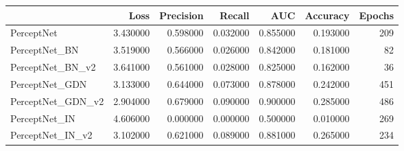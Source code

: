 \begin{tabular}{lrrrrrr}
\toprule
 & Loss & Precision & Recall & AUC & Accuracy & Epochs \\
\midrule
PerceptNet & 3.430000 & 0.598000 & 0.032000 & 0.855000 & 0.193000 & 209 \\
PerceptNet_BN & 3.519000 & 0.566000 & 0.026000 & 0.842000 & 0.181000 & 82 \\
PerceptNet_BN_v2 & 3.641000 & 0.561000 & 0.028000 & 0.825000 & 0.162000 & 36 \\
PerceptNet_GDN & 3.133000 & 0.644000 & 0.073000 & 0.878000 & 0.242000 & 451 \\
PerceptNet_GDN_v2 & 2.904000 & 0.679000 & 0.090000 & 0.900000 & 0.285000 & 486 \\
PerceptNet_IN & 4.606000 & 0.000000 & 0.000000 & 0.500000 & 0.010000 & 269 \\
PerceptNet_IN_v2 & 3.102000 & 0.621000 & 0.089000 & 0.881000 & 0.265000 & 234 \\
\bottomrule
\end{tabular}
